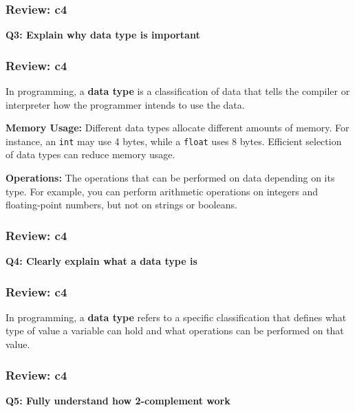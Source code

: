 \documentclass[
	11pt, %
]{beamer}
\begin{document}

\begin{frame}
	\frametitle{Review: c4}

	\textbf{Q3: Explain why data type is important}

\end{frame}


\begin{frame}
	\frametitle{Review: c4}
 
In programming, a \textbf{data type} is a classification of data that tells the compiler or interpreter how the programmer intends to use the data.

\vspace{0.5cm}

\textbf{Memory Usage:} Different data types allocate different amounts of memory. For instance, an \texttt{int} may use 4 bytes, while a \texttt{float} uses 8 bytes. Efficient selection of data types can reduce memory usage.

\vspace{0.5cm}

\textbf{Operations:} The operations that can be performed on data depending on its type. For example, you can perform arithmetic operations on integers and floating-point numbers, but not on strings or booleans.
\end{frame}

\begin{frame}
	\frametitle{Review: c4}

	\textbf{Q4: Clearly explain what a data type is}

\end{frame}


\begin{frame}
	\frametitle{Review: c4}

	In programming, a \textbf{data type} refers to a specific classification that defines what type of value a variable can hold and what operations can be performed on that value.


\end{frame}


\begin{frame}
	\frametitle{Review: c4}

	\textbf{Q5: Fully understand how 2-complement work}

\end{frame}
\end{document}
